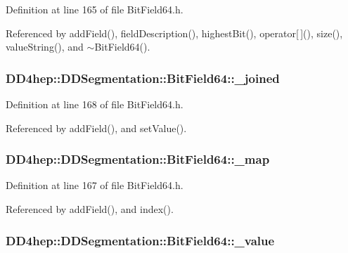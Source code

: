 Definition at line 165 of file BitField64.h.

Referenced by addField(), fieldDescription(), highestBit(), operator\mbox{[}$\,$\mbox{]}(), size(), valueString(), and $\sim$BitField64().\hypertarget{class_d_d4hep_1_1_d_d_segmentation_1_1_bit_field64_afbef9d9ffa1944254144159c518fc227}{
\subsubsection[{\_\-joined}]{ {\bf DD4hep::DDSegmentation::BitField64::\_\-joined}}}
\label{class_d_d4hep_1_1_d_d_segmentation_1_1_bit_field64_afbef9d9ffa1944254144159c518fc227}


Definition at line 168 of file BitField64.h.

Referenced by addField(), and setValue().\hypertarget{class_d_d4hep_1_1_d_d_segmentation_1_1_bit_field64_a0bf8be0d75f49e529d583f4025a6b23c}{
\subsubsection[{\_\-map}]{ {\bf DD4hep::DDSegmentation::BitField64::\_\-map}}}
\label{class_d_d4hep_1_1_d_d_segmentation_1_1_bit_field64_a0bf8be0d75f49e529d583f4025a6b23c}


Definition at line 167 of file BitField64.h.

Referenced by addField(), and index().\hypertarget{class_d_d4hep_1_1_d_d_segmentation_1_1_bit_field64_a5c784ab1cd7dcd334b3a06cd1ce496f4}{
\subsubsection[{\_\-value}]{ {\bf DD4hep::DDSegmentation::BitField64::\_\-value}}}
\label{class_d_d4hep_1_1_d_d_segmentation_1_1_bit_field64_a5c784ab1cd7dcd334b3a06cd1ce496f4}


